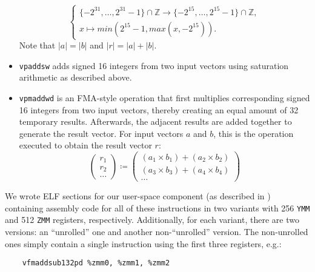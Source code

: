 \begin{itemize}
\begin{displaymath}
		\begin{cases}
			\{-2^{31}, \dots, 2^{31}-1\} \cap \mathbb{Z} \longrightarrow \{-2^{15}, \dots, 2^{15}-1\} \cap \mathbb{Z}, \\
			x \mapsto min(2^{15}-1, max(x, -2^{15})).
		\end{cases}
		\end{displaymath}
		Note that $|a| = |b|$ and $|r| = |a| + |b|$.
	\item \texttt{vpaddsw} adds signed \SI[number-unit-product=-]{16}{\bit} integers from two input vectors using saturation arithmetic as described above.
	\item \texttt{vpmaddwd} is an \gls{FMA}-style operation that first multiplies corresponding signed \SI[number-unit-product=-]{16}{\bit} integers from two input vectors, thereby creating an equal amount of \SI[number-unit-product=-]{32}{\bit} temporary results. Afterwards, the adjacent results are added together to generate the result vector. For input vectors $a$ and $b$, this is the operation executed to obtain the result vector $r$:
		\begin{displaymath}
		\begin{pmatrix}
		r_1 \\
		r_2 \\
		\dots
		\end{pmatrix}
		\coloneqq
		\begin{pmatrix}
		(a_1 \times b_1) + (a_2 \times b_2) \\
		(a_3 \times b_3) + (a_4 \times b_4) \\
		\dots
		\end{pmatrix}
		\end{displaymath}
\end{itemize}

We wrote \gls{ELF} sections for our user-space component (as described in ) containing assembly code for all of these instructions in two variants with \SI[number-unit-product=-]{256}{\bit} \texttt{YMM} and \SI[number-unit-product=-]{512}{\bit} \texttt{ZMM} registers, respectively. Additionally, for each variant, there are two versions: an \enquote{unrolled} one and another non-\enquote{unrolled} version. The non-unrolled ones simply contain a single instruction using the first three registers, e.g.:

\begin{center}
	\begin{verbatim}
	vfmaddsub132pd %zmm0, %zmm1, %zmm2
	\end{verbatim}
\end{center}

